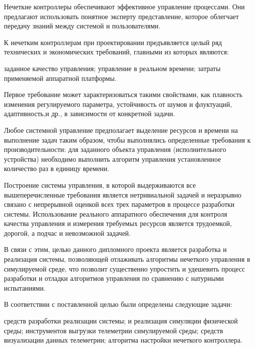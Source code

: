 %



Нечеткие контроллеры обеспечивают эффективное управление процессами. Они предлагают использовать понятное эксперту представление, которое облегчает передачу знаний между системой и пользователями.

К нечетким контроллерам при проектировании предъявляется целый ряд технических и экономических требований, главными из которых являются:

\begin{itemize}
   заданное качество управления;
   управление в реальном времени; 
   затраты применяемой аппаратной платформы.
\end{itemize}

Первое требование может характеризоваться такими свойствами, как плавность изменения регулируемого параметра, устойчивость от шумов и флуктуаций, адаптивность,и др., в зависимости от конкретной задачи.

Любое системной управление предполагает выделение ресурсов и времени на выполнение задач таким образом, чтобы выполнялись определенные требования к производительности: для заданного объекта управления (исполнительного устройства) необходимо выполнить алгоритм управления установленное количество раз в единицу времени. 

Построение системы управления, в которой выдерживаются все вышеперечисленные требования является нетривиальной задачей и неразрывно связано с непрерывной оценкой всех трех параметров в процессе разработки системы. Использование реального аппаратного обеспечения для контроля качества управления и измерения требуемых ресурсов является трудоемкой, дорогой, а подчас и невозможной задачей.

В связи с этим, целью данного дипломного проекта является разработка и реализация системы, позволяющей отлаживать алгоритмы нечеткого управления в симулируемой среде, что позволит существенно упростить и удешевить процесс разработки и отладки алгоритмов управления по сравнению с натурными испытаниями.	

В соответствии с поставленной целью были определены следующие задачи:

\begin{itemize}
   средств разработки реализации системы;
   и реализация симуляции физической среды;
   инструментов выгрузки телеметрии симулируемой среды;
   средств визуализации данных телеметрии;
   алгоритма настройки нечеткого контроллера.
\end{itemize}